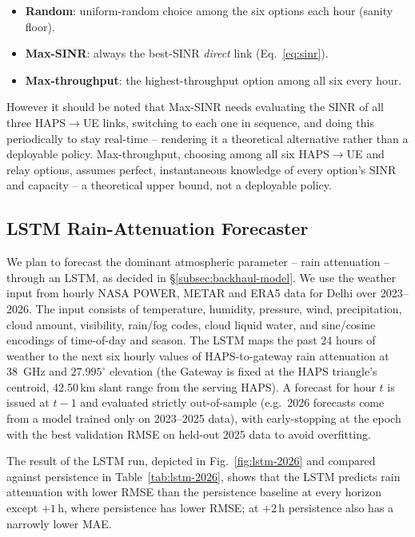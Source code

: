 \documentclass[]{ieeeaccess}
\begin{document}
\begin{itemize}\setlength{\itemsep}{1pt}
  \item \textbf{Random}: uniform-random choice among the six options each hour (sanity floor).
  \item \textbf{Max-SINR}: always the best-SINR \emph{direct} link (Eq.~\eqref{eq:sinr}).
  \item \textbf{Max-throughput}: the highest-throughput option among all six every hour.
\end{itemize}

However it should be noted that Max-SINR needs evaluating the SINR of all three HAPS$\to$UE links, switching to each one in sequence, and doing this periodically to stay real-time -- rendering it a theoretical alternative rather than a deployable policy. Max-throughput, choosing among all six HAPS$\to$UE and relay options, assumes perfect, instantaneous knowledge of every option's SINR and capacity -- a theoretical upper bound, not a deployable policy.

\subsection{LSTM Rain-Attenuation Forecaster}
\label{sec:lstm}

We plan to forecast the dominant atmospheric parameter -- rain attenuation -- through an LSTM, as decided in \S\ref{subsec:backhaul-model}. We use the weather input from hourly NASA POWER, METAR and ERA5 data for Delhi over 2023--2026. The input consists of temperature, humidity, pressure, wind, precipitation, cloud amount, visibility, rain/fog codes, cloud liquid water, and sine/cosine encodings of time-of-day and season. The LSTM maps the past 24 hours of weather to the next six hourly values of HAPS-to-gateway rain attenuation at 38~GHz and $27.995^\circ$ elevation (the Gateway is fixed at the HAPS triangle's centroid, 42.50\,km slant range from the serving HAPS). A forecast for hour $t$ is issued at $t-1$ and evaluated strictly out-of-sample (e.g.\ 2026 forecasts come from a model trained only on 2023--2025 data), with early-stopping at the epoch with the best validation RMSE on held-out 2025 data to avoid overfitting.

The result of the LSTM run, depicted in Fig.~\ref{fig:lstm-2026} and compared against persistence in Table~\ref{tab:lstm-2026}, shows that the LSTM predicts rain attenuation with lower RMSE than the persistence baseline at every horizon except $+1$\,h, where persistence has lower RMSE; at $+2$\,h persistence also has a narrowly lower MAE.
\end{document}
